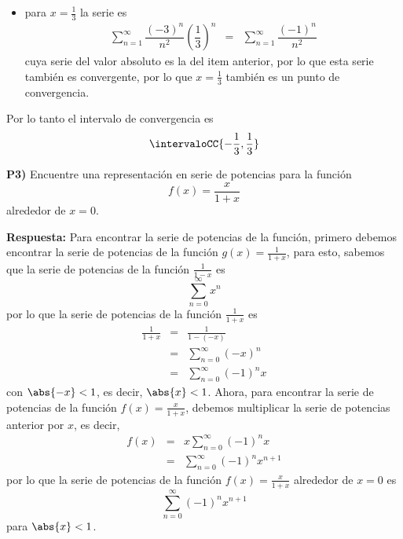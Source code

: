 \documentclass{article}
\begin{document}
\begin{enumerate}[a)]
\begin{itemize}
    \item para $x=\frac{1}{3}$ la serie es
    \begin{eqnarray*}
      \sum_{n=1}^{\infty}\dfrac{(-3)^n}{n^2}\left(\dfrac{1}{3}\right)^n
        &=& \sum_{n=1}^{\infty}\dfrac{(-1)^n}{n^2}
    \end{eqnarray*}
    cuya serie del valor absoluto es la del item anterior, por lo que esta serie también es convergente, por lo que $x=\frac{1}{3}$ también es un punto de convergencia.
  \end{itemize}
  Por lo tanto el intervalo de convergencia es $$\intervaloCC{-\frac{1}{3},\frac{1}{3}}$$
\end{enumerate}


\newpage
\noindent\textbf{P3) } Encuentre una representación en serie de potencias para la función $$f(x)=\dfrac{x}{1+x}$$ alrededor de $x=0$.

\vspace{2mm}
\noindent\textbf{Respuesta:} Para encontrar la serie de potencias de la función, primero debemos encontrar la serie de potencias de la función $g(x)=\frac{1}{1+x}$, para esto, sabemos que la serie de potencias de la función $\frac{1}{1-x}$ es
$$\sum_{n=0}^{\infty}x^n$$
por lo que la serie de potencias de la función $\frac{1}{1+x}$ es
\begin{eqnarray*}
  \frac{1}{1+x}
    &=& \frac{1}{1-(-x)}\\
    &=& \sum_{n=0}^{\infty}(-x)^n\\
    &=& \sum_{n=0}^{\infty}(-1)^nx
\end{eqnarray*}
con $\abs{-x}<1$, es decir, $\abs{x}<1$.
Ahora, para encontrar la serie de potencias de la función $f(x)=\frac{x}{1+x}$, debemos multiplicar la serie de potencias anterior por $x$, es decir,
\begin{eqnarray*}
  f(x)
    &=& x\sum_{n=0}^{\infty}(-1)^nx\\
    &=& \sum_{n=0}^{\infty}(-1)^nx^{n+1}
\end{eqnarray*}
por lo que la serie de potencias de la función $f(x)=\frac{x}{1+x}$ alrededor de $x=0$ es
$$\sum_{n=0}^{\infty}(-1)^nx^{n+1}$$
para $\abs{x}<1$.
\end{document}
